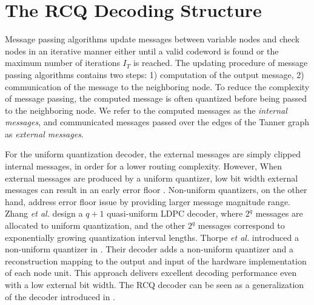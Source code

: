 \documentclass [PhD] {uclathes}
\begin{document}
\section{The RCQ Decoding Structure}\label{sec: RCQ-decoding-stru}
Message passing algorithms update messages between variable nodes and check nodes in an iterative manner either until a valid codeword is found or the maximum number of iterations $I_T$ is reached. 
The updating procedure of message passing algorithms contains two steps: 1) computation of the output message, 2) communication of the message to the neighboring node. To reduce the complexity of message passing, the computed message is often quantized  before being passed  to the neighboring node.  We refer to the computed messages as the \textit{internal messages}, and communicated messages passed over the edges of the Tanner graph as  \textit{external messages}.

For the uniform quantization decoder, the external messages are simply clipped internal messages, in order for a lower routing complexity. However, 
When external messages are produced by a uniform quantizer, low bit width external messages can result in an early error floor \cite{Zhang2014-ib}.
Non-uniform quantizers, on the other hand, address error floor issue by providing larger message magnitude range.
Zhang \emph{et al.} design a $q+1$ quasi-uniform LDPC decoder, where $2^q$ messages are allocated to uniform quantization, and the other $2^q$ messages correspond to exponentially growing quantization interval lengths\cite{Zhang2014-ib}. 
Thorpe \emph{et al.} introduced a non-uniform quantizer in \cite{-_Lee2005-MIMQBP}.  Their decoder adds a non-uniform quantizer and a reconstruction mapping to the output and input of the hardware implementation of each node unit. 
This approach delivers excellent decoding performance even with a low external bit width.  The RCQ decoder \cite{Wang2020-RCQ} can be seen as a generalization of the decoder introduced in \cite{-_Lee2005-MIMQBP}.
\end{document}
